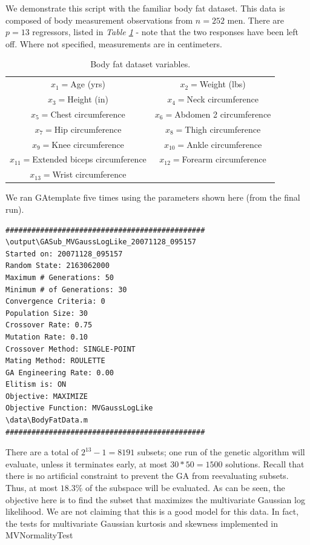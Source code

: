 \documentclass{book}
\newcommand{\textcode}[1]{\textsf{\small #1}}   %
\begin{document}
We demonstrate this script with the familiar body fat dataset. This data is
composed of body measurement observations from $n=252$ men. There are $p=13$
regressors, listed in \emph{Table \ref{tab_body}} - note that the two
responses have been left off. Where not specified, measurements are in
centimeters.
\begin{table}[htbp]
\begin{center}
\begin{tabular}{cc}
$x_{1}=$Age (yrs) & $x_{2}=$Weight (lbs) \\
$x_{3}=$Height (in) & $x_{4}=$Neck circumference \\
$x_{5}=$Chest circumference & $x_{6}=$Abdomen 2 circumference \\
$x_{7}=$Hip circumference & $x_{8}=$Thigh circumference \\
$x_{9}=$Knee circumference & $x_{10}=$Ankle circumference \\
$x_{11}=$Extended biceps circumference & $x_{12}=$Forearm circumference \\
$x_{13}=$Wrist circumference &
\end{tabular}%
\end{center}
\caption{Body fat dataset variables.}
\label{tab_body}
\end{table}
We ran \textcode{GAtemplate} five times using the parameters
shown here (from the final run).
\begin{verbatim}
##############################################
\output\GASub_MVGaussLogLike_20071128_095157
Started on: 20071128_095157
Random State: 2163062000
Maximum # Generations: 50
Minimum # of Generations: 30
Convergence Criteria: 0
Population Size: 30
Crossover Rate: 0.75
Mutation Rate: 0.10
Crossover Method: SINGLE-POINT
Mating Method: ROULETTE
GA Engineering Rate: 0.00
Elitism is: ON
Objective: MAXIMIZE
Objective Function: MVGaussLogLike
\data\BodyFatData.m
##############################################
\end{verbatim}
There are a total of $2^{13}-1=8191$ subsets; one run of the
genetic algorithm will evaluate, unless it terminates early, at
most $30\ast 50=1500$ solutions. Recall that there is no
artificial constraint to prevent the GA from reevaluating
subsets. Thus, at most $18.3\%$ of the subspace will be
evaluated. As can be seen, the objective here is to find the
subset that maximizes the multivariate Gaussian log likelihood.
We are not claiming that this is a good model for this data. In
fact, the tests for multivariate Gaussian kurtosis and skewness
implemented in \textcode{MVNormalityTest}
\end{document}
